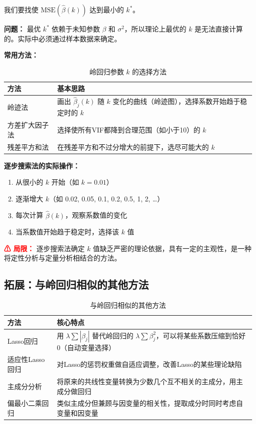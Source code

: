 \documentclass[12pt,a4paper]{ctexart}
\begin{document}
我们要找使 $\text{MSE}(\hat{\beta}(k))$ 达到最小的 $k^*$。

\textbf{问题：} 最优 $k^*$ 依赖于未知参数 $\beta$ 和 $\sigma^2$，所以理论上最优的 $k$ 是无法直接计算的。实际中必须通过样本数据来确定。

\textbf{常用方法：}

\begin{table}[htbp]
\centering
\caption{岭回归参数 $k$ 的选择方法}
\begin{tabularx}{\textwidth}{@{}l X@{}}
\toprule
\textbf{方法} & \textbf{基本思路} \\
\midrule
岭迹法 & 画出 $\hat{\beta}_j(k)$ 随 $k$ 变化的曲线（岭迹图），选择系数开始趋于稳定时的 $k$ \\
方差扩大因子法 & 选择使所有VIF都降到合理范围（如小于10）的 $k$ \\
残差平方和法 & 在残差平方和不过分增大的前提下，选尽可能大的 $k$ \\
\bottomrule
\end{tabularx}
\end{table}

\textbf{逐步搜索法的实际操作：}
\begin{enumerate}
\item 从很小的 $k$ 开始（如 $k = 0.01$）
\item 逐渐增大 $k$（如 0.02, 0.05, 0.1, 0.2, 0.5, 1, 2, \dots）
\item 每次计算 $\hat{\beta}(k)$，观察系数值的变化
\item 当系数值开始趋于稳定时，选择该 $k$ 值
\end{enumerate}

\textcolor{red}{\textbf{⚠ 局限：}} 逐步搜索法确定 $k$ 值缺乏严密的理论依据，具有一定的主观性，是一种将定性分析与定量分析相结合的方法。

\subsection*{拓展：与岭回归相似的其他方法}

\begin{table}[htbp]
\centering
\caption{与岭回归相似的其他方法}
\begin{tabularx}{\textwidth}{@{}l X@{}}
\toprule
\textbf{方法} & \textbf{核心特点} \\
\midrule
Lasso回归 & 用 $\lambda\sum|\beta_j|$ 替代岭回归的 $\lambda\sum\beta_j^2$，可以将某些系数压缩到恰好0（自动变量选择） \\
适应性Lasso回归 & 对Lasso的惩罚权重做自适应调整，改善Lasso的某些理论缺陷 \\
主成分分析 & 将原来的共线性变量转换为少数几个互不相关的主成分，用主成分做回归 \\
偏最小二乘回归 & 类似主成分但兼顾与因变量的相关性，提取成分时同时考虑自变量和因变量 \\
\bottomrule
\end{tabularx}
\end{table}
\end{document}
